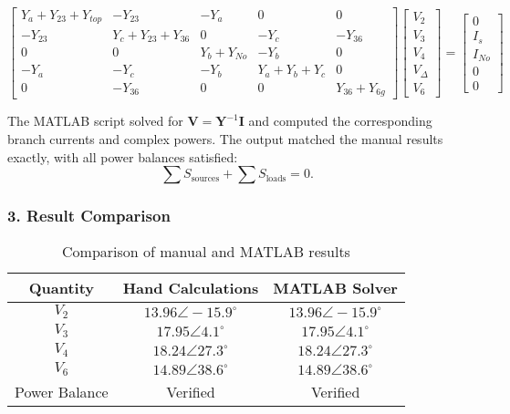 \documentclass{article}
\begin{document}
\[
\begin{bmatrix}
Y_a+Y_{23}+Y_{top} & -Y_{23} & -Y_a & 0 & 0\\
-Y_{23} & Y_c+Y_{23}+Y_{36} & 0 & -Y_c & -Y_{36}\\
0 & 0 & Y_b+Y_{No} & -Y_b & 0\\
-Y_a & -Y_c & -Y_b & Y_a+Y_b+Y_c & 0\\
0 & -Y_{36} & 0 & 0 & Y_{36}+Y_{6g}
\end{bmatrix}
\begin{bmatrix}
V_2\\V_3\\V_4\\V_{\Delta}\\V_6
\end{bmatrix}
=
\begin{bmatrix}
0\\I_s\\I_{No}\\0\\0
\end{bmatrix}
\]

The MATLAB script solved for $\mathbf{V} = \mathbf{Y}^{-1}\mathbf{I}$ and computed the corresponding branch currents and complex powers.
The output matched the manual results exactly, with all power balances satisfied:
\[
\sum S_{\text{sources}} + \sum S_{\text{loads}} = 0.
\]

\subsubsection*{3. Result Comparison}

\begin{table}[H]
\centering
\caption{Comparison of manual and MATLAB results}
\begin{tabular}{|c|c|c|}
\hline
\textbf{Quantity} & \textbf{Hand Calculations} & \textbf{MATLAB Solver} \\
\hline
$V_2$ & $13.96\angle -15.9^{\circ}$ & $13.96\angle -15.9^{\circ}$ \\
$V_3$ & $17.95\angle 4.1^{\circ}$ & $17.95\angle 4.1^{\circ}$ \\
$V_4$ & $18.24\angle 27.3^{\circ}$ & $18.24\angle 27.3^{\circ}$ \\
$V_6$ & $14.89\angle 38.6^{\circ}$ & $14.89\angle 38.6^{\circ}$ \\
\hline
Power Balance & Verified & Verified \\
\hline
\end{tabular}
\end{table}
\end{document}
